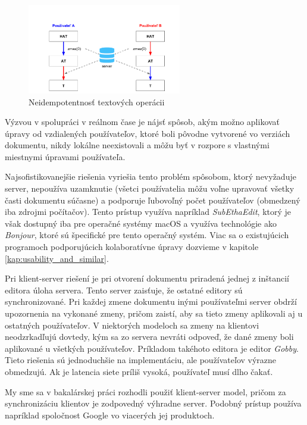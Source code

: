 \begin{figure}[H]
\centerline{\includegraphics[width=0.6\textwidth]{images/neidempotentne_operacie}}
\caption[Neidempotentnosť textových operácii]{Neidempotentnosť textových operácii}
\label{obr:neidempotentnost}
\end{figure}

Výzvou v spolupráci v reálnom čase je nájsť spôsob, akým možno aplikovať úpravy od vzdialených
používateľov, ktoré boli pôvodne vytvorené vo verziách dokumentu, nikdy lokálne neexistovali a môžu
byť v rozpore s vlastnými miestnymi úpravami používateľa. 

Najsofistikovanejšie riešenia vyriešia tento problém spôsobom, ktorý nevyžaduje server, nepoužíva
uzamknutie (všetci používatelia môžu voľne upravovať všetky časti dokumentu súčasne) a podporuje
ľubovoľný počet používateľov (obmedzený iba zdrojmi počítačov). Tento prístup využíva napríklad
\textit{SubEthaEdit}, ktorý je však dostupný iba pre operačné systémy macOS a využíva
technológie ako \textit{Bonjour}, ktoré sú špecifické pre tento operačný systém. Viac sa o
existujúcich programoch podporujúcich kolaboratívne úpravy dozvieme v kapitole
\ref{kap:usability_and_similar}.

Pri klient-server riešení je pri otvorení dokumentu priradená jednej z inštancií editora
úloha servera. Tento server zaisťuje, že ostatné editory sú synchronizované. Pri každej zmene
dokumentu inými používateľmi server obdrží upozornenia na vykonané zmeny, pričom zaistí, aby
sa tieto zmeny aplikovali aj u ostatných používateľov. 
V niektorých modeloch sa zmeny na klientovi neodzrkadľujú dovtedy,
kým sa zo servera nevráti odpoveď, že dané zmeny boli aplikované u všetkých používateľov.
Príkladom takéhoto editora je editor \textit{Gobby}. Tieto riešenia sú 
jednoduchšie na implementáciu, ale používateľov výrazne obmedzujú. Ak je latencia siete
príliš vysoká, používateľ musí dlho čakať.

My sme sa v bakalárskej práci rozhodli použiť klient-server model, pričom za synchronizáciu klientov
je zodpovedný výhradne server. Podobný prístup používa napríklad spoločnost Google vo 
viacerých jej produktoch.

